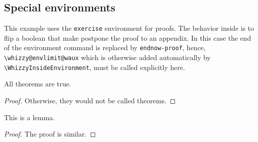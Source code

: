 \documentclass{article}
\newenvironment{drawer}[1]{\subsection{#1}}{}
\begin{document}
\begin{drawer}{Special environments}
This example uses the \verb"exercise" environment for proofs.
The behavior inside is to flip a boolean that make postpone the proof to an
appendix. In this case the end of the environment command is replaced
by \verb"endnow-proof", hence, 
\verb"\whizzy@envlimit@waux" which is otherwise added automatically by
\verb"\WhizzyInsideEnvironment", must be called explicitly here.
\begin{theorem}
All theorems are true.
\end{theorem}
\begin{proof}{}
Otherwise, they would not be called theorems. 
\end{proof}
\begin{lemma}
This is a lemma. 
\end{lemma}
\begin{proof}{}
The proof is similar.
\end{proof}
\end{drawer}
\end{document}
